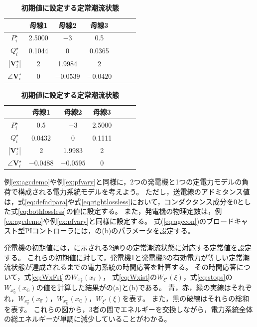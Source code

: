 \documentclass[tombow,dvipdfmx]{corona-a5-1.1}
\begin{document}
\begin{table}[h]
\medskip
\caption{\textbf{初期値に設定する定常潮流状態}} \label{table:pflownl}
 \centering
  {
  \begin{minipage}{0.49\linewidth}
    \centering
  \begin{tabular}{|c|c|c|c|c|c|c|}
   \hline
 &  母線1 & 母線2 & 母線3 \\
   \hline 
   $P_i^{\star}$ & 2.5000 & $-3$ & 0.5 \\
   \hline
   $Q_i^{\star}$ & 0.1044 & 0 & 0.0365 \\
   \hline
   $|\bm{V}_i^{\star}|$ & 2 & 1.9984 & 2 \\
   \hline
   $\angle \bm{V}_i^{\star}$ & 0 & $-0.0539$ & $-0.0420$ \\
   \hline
  \end{tabular}
  \end{minipage}
  \begin{minipage}{0.49\linewidth}
    \centering
  \begin{tabular}{|c|c|c|c|c|c|c|}
   \hline
 &  母線1 & 母線2 & 母線3 \\
   \hline 
   $P_i^{\star}$ & 0.5 & $-3$ & 2.5000 \\
   \hline
   $Q_i^{\star}$ & 0.0432 & 0 & 0.1111 \\
   \hline
   $|\bm{V}_i^{\star}|$ & 2 & 1.9983 & 2 \\
   \hline
   $\angle \bm{V}_i^{\star}$ & $-0.0488$ & $-0.0595$ & 0 \\
   \hline
  \end{tabular}
  \end{minipage}
  }
\end{table}

\begin{例}[蓄積されるエネルギーの時間変化]\label{ex:nonlinene}
例\ref{ex:agcdemo}や例\ref{ex:pfvary}と同様に，2つの発電機と1つの定電力モデルの負荷で構成される電力系統モデルを考えよう。
ただし，送電線のアドミタンス値は，式\ref{eq:defadpara}や式\ref{eq:rightlossless}において，コンダクタンス成分を0とした式\ref{eq:bothlossless}の値に設定する。
また，発電機の物理定数は，例\ref{ex:agcdemo}や例\ref{ex:pfvary}と同様に設定する。
式(\ref{eq:agccon})のブロードキャスト型PIコントローラには，の(b)のパラメータを設定する。

発電機の初期値には，に示される2通りの定常潮流状態に対応する定常値を設定する。
これらの初期値に対して，発電機1と発電機3の有効電力が等しい定常潮流状態が達成されるまでの電力系統の時間応答を計算する。
その時間応答について，式\ref{eq:WxFst}の$W_{x^{\star}_{\mathds{F}}}(x_{\mathds{F}})$，
式\ref{eq:Wxist}の$W_{\xi^{\star}}(\xi)$，式\ref{eq:stops}の$W_{x^{\star}_{\mathds{G}}}(x_{\mathds{G}})$の値を計算した結果がの(a)と(b)である。
青，赤，緑の実線はそれぞれ，$W_{x^{\star}_{\mathds{F}}}(x_{\mathds{F}})$，$W_{x^{\star}_{\mathds{G}}}(x_{\mathds{G}})$，$W_{\xi^{\star}}(\xi)$を表す。
また，黒の破線はそれらの総和を表す。
これらの図から，3者の間でエネルギーを交換しながら，電力系統全体の総エネルギーが単調に減少していることがわかる。
\end{例}
\end{document}
